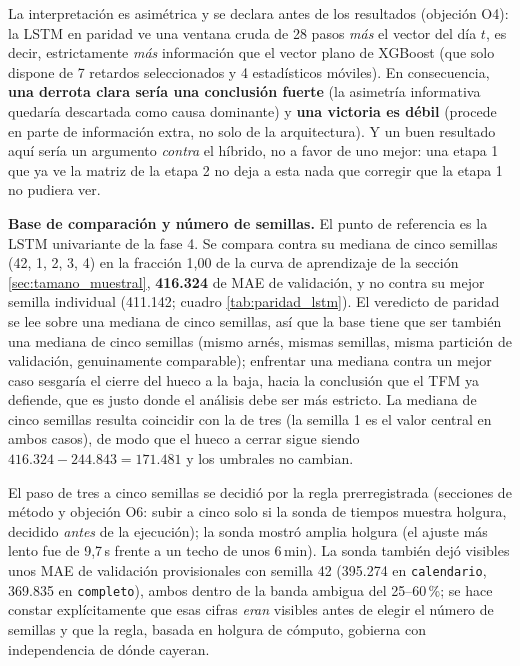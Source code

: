 La interpretación es asimétrica y se declara antes de los resultados (objeción O4):
la LSTM en paridad ve una ventana cruda de 28 pasos \emph{más} el vector del día $t$, es
decir, estrictamente \emph{más} información que el vector plano de XGBoost (que solo dispone
de 7 retardos seleccionados y 4 estadísticos móviles). En consecuencia, \textbf{una derrota
clara sería una conclusión fuerte} (la asimetría informativa quedaría descartada como causa
dominante) y \textbf{una victoria es débil} (procede en parte de información extra, no solo
de la arquitectura). Y un buen resultado aquí sería un argumento \emph{contra} el híbrido,
no a favor de uno mejor: una etapa 1 que ya ve la matriz de la etapa 2 no deja a esta nada
que corregir que la etapa 1 no pudiera ver.

\textbf{Base de comparación y número de semillas.} El punto de referencia es la LSTM
univariante de la fase 4. Se compara contra su mediana de cinco semillas
(42, 1, 2, 3, 4) en la fracción 1,00 de la curva de aprendizaje de la sección
\ref{sec:tamano_muestral}, \textbf{416.324} de MAE de validación, y no contra su mejor
semilla individual (411.142; cuadro \ref{tab:paridad_lstm}). El veredicto de paridad se lee sobre una mediana de
cinco semillas, así que la base tiene que ser también una mediana de cinco semillas (mismo
arnés, mismas semillas, misma partición de validación, genuinamente comparable); enfrentar
una mediana contra un mejor caso sesgaría el cierre del hueco a la baja, hacia la
conclusión que el TFM ya defiende, que es justo donde el análisis debe ser más estricto. La
mediana de cinco semillas resulta coincidir con la de tres (la semilla 1 es el valor
central en ambos casos), de modo que el hueco a cerrar sigue siendo $416.324 - 244.843 =
171.481$ y los umbrales no cambian.

El paso de tres a cinco semillas se decidió por la
regla prerregistrada (secciones de método y objeción O6: subir a cinco solo si la sonda de
tiempos muestra holgura, decidido \emph{antes} de la ejecución); la sonda mostró amplia
holgura (el ajuste más lento fue de 9,7\,s frente a un techo de unos 6\,min). La sonda
también dejó visibles unos MAE de validación provisionales con semilla 42 (395.274 en
\texttt{calendario}, 369.835 en \texttt{completo}), ambos dentro de la banda ambigua del
25--60\,\%; se hace constar explícitamente que esas cifras \emph{eran} visibles antes de
elegir el número de semillas y que la regla, basada en holgura de cómputo, gobierna con
independencia de dónde cayeran.

